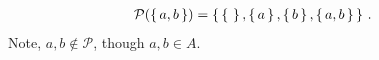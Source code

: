 \guard



\begin{exmp}
\label{exmp:powerSetEasy}
  \begin{align*}
    \mathcal{P}(\left\{\,a,b\,\right\}) &= \left\{\, \left\{\,\,\right\}, \left\{\,a\,\right\}, \left\{\,b\,\right\}, \left\{\,a,b\,\right\} \,\right\}\,.
  \end{align*}
  Note, $a,b\not\in\mathcal{P}$, though $a,b\in A$.
\end{exmp}

